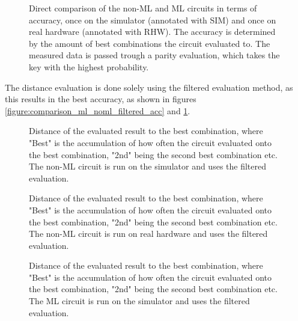 \begin{figure}[!h]
    \centering
    \scalebox{\resultboxplot}{
        
    }
    \caption{Direct comparison of the non-ML and ML circuits in terms of accuracy, once on the simulator (annotated with SIM) and once on real hardware (annotated with RHW). The accuracy is determined by the amount of best combinations the circuit evaluated to. The measured data is passed trough a parity evaluation, which takes the key with the highest probability.}
    \label{figure:comparison_ml_noml_parity_acc}
\end{figure}

The distance evaluation is done solely using the filtered evaluation method, as this results in the best accuracy, as shown in figures \ref{figure:comparison_ml_noml_filtered_acc} and \ref{figure:comparison_ml_noml_parity_acc}.

\begin{figure}[!h]
    \centering
    \scalebox{\resultboxplot}{
        
    }
    \caption{Distance of the evaluated result to the best combination, where "Best" is the accumulation of how often the circuit evaluated onto the best combination, "2nd" being the second best combination etc. The non-ML circuit is run on the simulator and uses the filtered evaluation.}
    \label{figure:noml_sim_distance}
\end{figure}

\begin{figure}[!h]
    \centering
    \scalebox{\resultboxplot}{
        
    }
    \caption{Distance of the evaluated result to the best combination, where "Best" is the accumulation of how often the circuit evaluated onto the best combination, "2nd" being the second best combination etc. The non-ML circuit is run on real hardware and uses the filtered evaluation.}
    \label{figure:noml_rhw_dist}
\end{figure}

\begin{figure}[!h]
    \centering
    \scalebox{\resultboxplot}{
        
    }
    \caption{Distance of the evaluated result to the best combination, where "Best" is the accumulation of how often the circuit evaluated onto the best combination, "2nd" being the second best combination etc. The ML circuit is run on the simulator and uses the filtered evaluation.}
    \label{figure:ml_sim_distance}
\end{figure}



